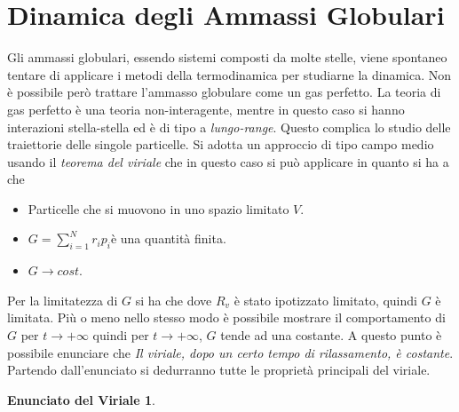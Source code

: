\section{Dinamica degli Ammassi Globulari}
Gli ammassi globulari, essendo sistemi composti da molte stelle, viene spontaneo tentare di applicare i metodi della termodinamica per studiarne la dinamica. Non \`e possibile per\`o trattare l'ammasso globulare come un gas perfetto. La teoria di gas perfetto \`e una teoria non-interagente, mentre in questo caso si hanno interazioni stella-stella ed \`e di tipo a \emph{lungo-range}. Questo complica lo studio delle traiettorie delle singole particelle. Si adotta un approccio di tipo campo medio usando il \emph{teorema del viriale} che in questo caso si pu\`o applicare in quanto si ha a che
\begin{itemize}
	\item Particelle che si muovono in uno spazio limitato $V$.
	\item $G=\sum_{i=1}^Nr_ip_i$\`e una quantit\`a finita. 
	\item $G\to cost$.
\end{itemize}

Per la limitatezza di $G$ si ha che 
dove $R_v$ \`e stato ipotizzato limitato, quindi $G$ \`e limitata. Pi\`u o meno nello stesso modo \`e possibile mostrare il comportamento di $G$ per $t\to+\infty$
quindi per $t\to+\infty$, $G$ tende ad una costante. A questo punto \`e possibile enunciare che \emph{Il viriale, dopo un certo tempo di rilassamento, \`e costante}. Partendo dall'enunciato si dedurranno tutte le propriet\`a principali del viriale.

\newtheorem*{mydef}{Enunciato del Viriale}
\begin{mydef}
\end{mydef}

